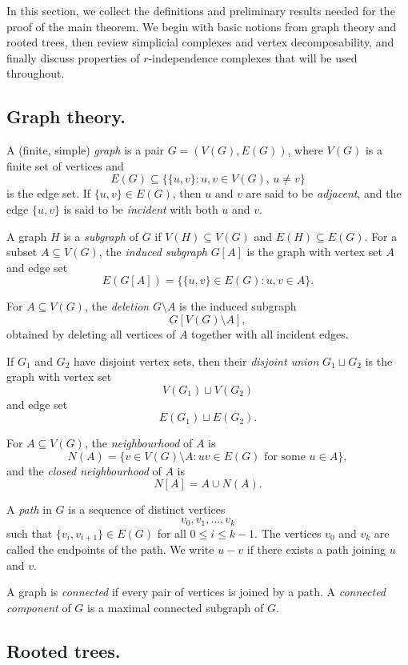 \documentclass[12pt,reqno]{amsart}
\theoremstyle{definition}
\begin{document}
In this section, we collect the definitions and preliminary results needed for the proof of the main theorem. We begin with basic notions from graph theory and rooted trees, then review simplicial complexes and vertex decomposability, and finally discuss properties of $r$-independence complexes that will be used throughout.


\subsection{Graph theory.}

A (finite, simple) \emph{graph} is a pair $G=(V(G),E(G))$, where $V(G)$ is a finite set of vertices and
\[
E(G)\subseteq \{\{u,v\}:u,v\in V(G),\,u\neq v\}
\]
is the edge set. If $\{u,v\} \in E(G)$, then $u$ and $v$ are said to be \emph{adjacent}, and the edge $\{u,v\}$ is said to be \emph{incident} with both $u$ and $v$.

A graph \(H\) is a \emph{subgraph} of \(G\) if \(V(H)\subseteq V(G)\) and \(E(H)\subseteq E(G)\). For a subset \(A\subseteq V(G)\), the \emph{induced subgraph} \(G[A]\) is the graph with vertex set \(A\) and edge set
\[
E(G[A])
=
\{\{u,v\}\in E(G):u,v\in A\}.
\]

For \(A\subseteq V(G)\), the \emph{deletion} \(G\setminus A\) is the induced subgraph
\[
G[V(G)\setminus A],
\]
obtained by deleting all vertices of \(A\) together with all incident edges.

If \(G_1\) and \(G_2\) have disjoint vertex sets, then their \emph{disjoint union} \(G_1\sqcup G_2\) is the graph with vertex set
\[
V(G_1)\sqcup V(G_2)
\]
and edge set
\[
E(G_1)\sqcup E(G_2).
\]

For \(A\subseteq V(G)\), the \emph{neighbourhood} of \(A\) is
\[
N(A)
=
\{v\in V(G)\setminus A : uv\in E(G)\text{ for some }u\in A\},
\]
and the \emph{closed neighbourhood} of \(A\) is
\[
N[A]=A\cup N(A).
\]

A \emph{path} in \(G\) is a sequence of distinct vertices
\[
v_0,v_1,\dots,v_k
\]
such that \(\{v_i,v_{i+1}\}\in E(G)\) for all \(0\le i\le k-1\). The vertices \(v_0\) and \(v_k\) are called the endpoints of the path. We write \(u-v\) if there exists a path joining \(u\) and \(v\).

A graph is \emph{connected} if every pair of vertices is joined by a path. A \emph{connected component} of \(G\) is a maximal connected subgraph of \(G\).

\subsection{Rooted trees.}
\end{document}
